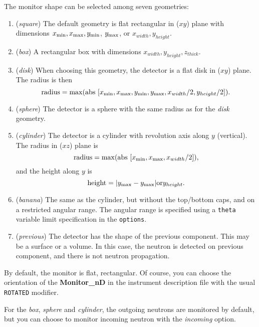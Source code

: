 The monitor shape can be selected among seven geometries:
\begin{enumerate}
\item{({\it square}) The default geometry is flat rectangular in ($xy$)
    plane with dimensions $x_{\rm min}, x_{\rm max}, y_{\rm min}$,
    $y_{\rm max}$, or $x_{width}, y_{height}$.}
\item{({\it box}) A rectangular box with dimensions $x_{width}, y_{height}, z_{thick}$.}
\item{({\it disk}) When choosing this geometry, the detector is a flat
    disk in ($xy$) plane. The radius is then
    \begin{equation}
      \mbox{radius} = \max ( \mbox{abs } [ x_{\rm min}, x_{\rm max}, y_{\rm
        min}, y_{\rm max}, x_{width}/2, y_{height}/2 ] ).
    \end{equation}
    }
\item{({\it sphere}) The detector is a sphere with the same radius as
    for the {\it disk} geometry.}
\item{({\it cylinder}) The detector is a cylinder with revolution axis
    along $y$ (vertical). The radius in ($xz$) plane is
    \begin{equation}
      \mbox{radius} =  \max ( \mbox{abs } [ x_{\rm min}, x_{\rm max}, x_{width}/2 ] ),
    \end{equation}
    and the height along $y$ is
    \begin{equation}
      \mbox{height} =  | y_{\rm max} - y_{\rm max} | {\rm or} y_{height}.
    \end{equation}
    }
\item{({\it banana}) The same as the cylinder, but without the top/bottom caps, and on a restricted angular range. The angular range is specified using a \verb+theta+ variable limit specification in the \verb+options+.}
\item{({\it previous}) The detector has the shape of the previous component. This may be a surface or a volume. In this case, the neutron is detected on previous component, and there is not neutron propagation.}
\end{enumerate}

By default, the monitor is flat, rectangular. Of course, you can choose
the orientation of the {\bf Monitor\_nD} in the instrument description
file with the usual \texttt{ROTATED} modifier.

For the {\it box}, {\it sphere} and {\it cylinder}, the outgoing neutrons are
monitored by default, but you can choose to monitor incoming neutron
with the {\it incoming} option.

